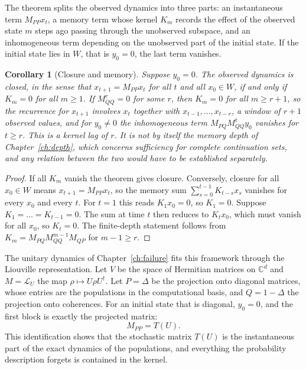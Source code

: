 \documentclass[11pt,oneside]{book}
\newtheorem{corollary}[theorem]{Corollary}
\theoremstyle{definition}
\theoremstyle{remark}
\begin{document}
The theorem splits the observed dynamics into three parts: an instantaneous term $M_{PP}x_t$, a memory term whose kernel $K_m$ records the effect of the observed state $m$ steps ago passing through the unobserved subspace, and an inhomogeneous term depending on the unobserved part of the initial state. If the initial state lies in $W$, that is $y_0=0$, the last term vanishes.

\begin{corollary}[Closure and memory]\label{cor:closure-kernel}
Suppose $y_0=0$. The observed dynamics is closed, in the sense that $x_{t+1}=M_{PP}x_t$ for all $t$ and all $x_0\in W$, if and only if $K_m=0$ for all $m\geq1$. If $M_{QQ}^r=0$ for some $r$, then $K_m=0$ for all $m\geq r+1$, so the recurrence for $x_{t+1}$ involves $x_t$ together with $x_{t-1},\dots,x_{t-r}$, a window of $r+1$ observed values, and for $y_0\neq0$ the inhomogeneous term $M_{PQ}M_{QQ}^ty_0$ vanishes for $t\geq r$. This is a \emph{kernel lag} of $r$. It is not by itself the memory depth of Chapter~\ref{ch:depth}, which concerns sufficiency for complete continuation sets, and any relation between the two would have to be established separately.
\end{corollary}

\begin{proof}
If all $K_m$ vanish the theorem gives closure. Conversely, closure for all $x_0\in W$ means $x_{t+1}=M_{PP}x_t$, so the memory sum $\sum_{s=0}^{t-1}K_{t-s}x_s$ vanishes for every $x_0$ and every $t$. For $t=1$ this reads $K_1x_0=0$, so $K_1=0$. Suppose $K_1=\dots=K_{t-1}=0$. The sum at time $t$ then reduces to $K_tx_0$, which must vanish for all $x_0$, so $K_t=0$. The finite-depth statement follows from $K_m=M_{PQ}M_{QQ}^{m-1}M_{QP}$ for $m-1\geq r$.
\end{proof}

The unitary dynamics of Chapter~\ref{ch:failure} fits this framework through the Liouville representation. Let $V$ be the space of Hermitian matrices on $\mathbb C^d$ and $M=\mathcal L_U$ the map $\rho\mapsto U\rho U^\dagger$. Let $P=\Delta$ be the projection onto diagonal matrices, whose entries are the populations in the computational basis, and $Q=1-\Delta$ the projection onto coherences. For an initial state that is diagonal, $y_0=0$, and the first block is exactly the projected matrix:
\[
M_{PP}=T(U).
\]
This identification shows that the stochastic matrix $T(U)$ is the instantaneous part of the exact dynamics of the populations, and everything the probability description forgets is contained in the kernel.
\end{document}
